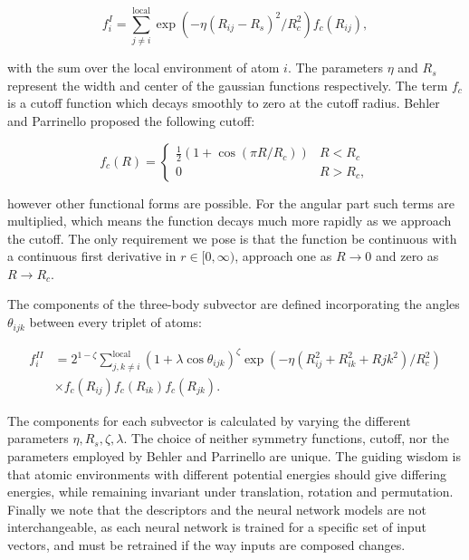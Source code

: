 $$ f_i^I = \sum_{j \neq i}^{\text{local}}
    \exp \left( -\eta(R_{ij} - R_s)^2 / R_c^2 \right) f_c (R_{ij}) , $$

with the sum over the local environment of atom $i$.
The parameters $\eta$ and $R_s$ represent the width and center
of the gaussian functions respectively. The term $f_c$
is a cutoff function which decays smoothly to zero
at the cutoff radius. Behler and Parrinello proposed
the following cutoff:

\begin{equation}
    f_c(R) = 
\begin{cases}
    \frac{1}{2}\left(1 + \cos \left(\pi R / R_c \right) \right) & R < R_c \\
    0 & R > R_c ,
\end{cases}
\end{equation}

however other functional forms are possible. For the angular part
such terms are multiplied, which means the function decays much more
rapidly as we approach the cutoff. The only requirement we pose
is that the function be continuous with a continuous first derivative
in $r \in [0, \infty)$, 
approach one as $R \rightarrow 0$
and zero as $R \rightarrow R_c$.
\par
The components of the three-body subvector are defined incorporating
the angles $\theta_{ijk}$ between every triplet of atoms:

\begin{equation}
\begin{split}
    f_i^{II} &= 2^{1 - \zeta} \sum_{j,k \neq i}^{\text{local}}
    (1 + \lambda \cos \theta_{ijk})^{\zeta}
    \exp \left( -\eta \left( R_{ij}^2 + R_{ik}^2 + R{jk}^2
    \right) / R_c^2 \right) \\
    & \times f_c(R_{ij}) f_c(R_{ik}) f_c(R_{jk}) .
\end{split}
\end{equation}

The components for each subvector is calculated by varying
the different parameters $\eta, R_s, \zeta, \lambda$.
The choice of neither symmetry functions, cutoff, nor the parameters
employed by Behler and Parrinello are unique. The guiding
wisdom is that atomic environments with different
potential energies should give differing energies,
while remaining invariant under translation, rotation and permutation.
Finally we note that the descriptors and the neural network
models are not interchangeable, as each neural network
is trained for a specific set of input vectors, and must
be retrained if the way inputs are composed changes.

